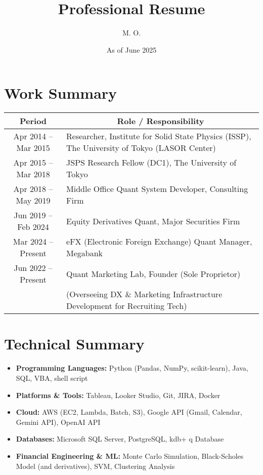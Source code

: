 \documentclass[uplatex,a4j,10.5pt,dvipdfmx]{jsarticle}
\title{\sffamily \bfseries Professional Resume}
\author{M. O.}
\date{As of June 2025}
\begin{document}
\maketitle

\section*{Work Summary}

\begin{longtable}{|c|p{14cm}|}
	\hline
	\multicolumn{1}{|c|}{\textbf{Period}} & \multicolumn{1}{c|}{\textbf{Role / Responsibility}}                                          \\
	\hline
	\endhead

	\hline
	Apr 2014 -- Mar 2015                  & Researcher, Institute for Solid State Physics (ISSP), The University of Tokyo (LASOR Center) \\
	\hline
	Apr 2015 -- Mar 2018                  & JSPS Research Fellow (DC1), The University of Tokyo                                          \\
	\hline
	Apr 2018 -- May 2019                  & Middle Office Quant System Developer, Consulting Firm                                        \\
	\hline
	Jun 2019 -- Feb 2024                  & Equity Derivatives Quant, Major Securities Firm                                              \\
	\hline
	Mar 2024 -- Present                   & eFX (Electronic Foreign Exchange) Quant Manager, Megabank                                    \\
	\hline
	Jun 2022 -- Present                   & Quant Marketing Lab, Founder (Sole Proprietor)                                               \\
	                                      & (Overseeing DX \& Marketing Infrastructure Development for Recruiting Tech)                  \\
	\hline
\end{longtable}

\section*{Technical Summary}
\begin{itemize}[leftmargin=*]
	\item \textbf{Programming Languages:} Python (Pandas, NumPy, scikit-learn), Java, SQL, VBA, shell script
	\item \textbf{Platforms \& Tools:} Tableau, Looker Studio, Git, JIRA, Docker
	\item \textbf{Cloud:} AWS (EC2, Lambda, Batch, S3), Google API (Gmail, Calendar, Gemini API), OpenAI API
	\item \textbf{Databases:} Microsoft SQL Server, PostgreSQL, kdb+ q Database
	\item \textbf{Financial Engineering \& ML:} Monte Carlo Simulation, Black-Scholes Model (and derivatives), SVM, Clustering Analysis
\end{itemize}
\end{document}
